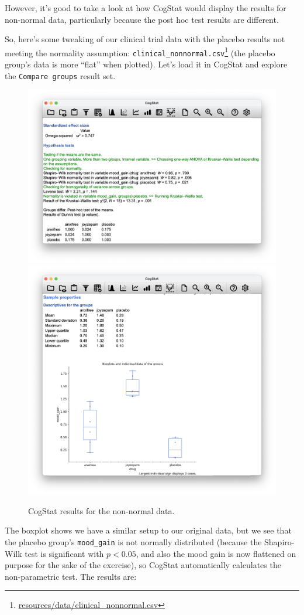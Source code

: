 \documentclass[
  11pt,
  a4paper,
  twoside,symmetric,openright]{book}
\theoremstyle{break}
\theoremstyle{break}
\DeclareRobustCommand{\href}[2]{#2\footnote{\url{#1}}}
\begin{document}
However, it's good to take a look at how CogStat would display the results for non-normal data, particularly because the post hoc test results are different.

So, here's some tweaking of our clinical trial data with the placebo results not meeting the normality assumption: \href{resources/data/clinical_nonnormal.csv}{\texttt{clinical\_nonnormal.csv}} (the placebo group's data is more ``flat'' when plotted). Let's load it in CogStat and explore the \texttt{Compare\ groups} result set.

\begin{figure}

{\centering \includegraphics[width=0.6\linewidth]{resources/image/cogstatclinicalnonnormal} \includegraphics[width=0.6\linewidth]{resources/image/cogstatclinicalnonnormalbox} 

}

\caption{CogStat results for the non-normal data.}\label{fig:kruskalclinical}
\end{figure}

The boxplot shows we have a similar setup to our original data, but we see that the placebo group's \texttt{mood\_gain} is not normally distributed (because the Shapiro-Wilk test is significant with \(p < 0.05\), and also the mood gain is now flattened on purpose for the sake of the exercise), so CogStat automatically calculates the non-parametric test. The results are:
\end{document}
